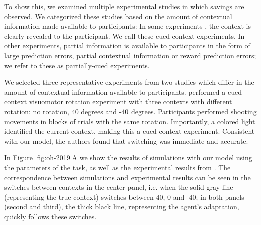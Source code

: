 \documentclass[a4paper,doc,floatsintext,natbib]{apa6}%
\def \fref #1{Figure \ref{#1}}     %
\begin{document}
To show this, we examined multiple experimental studies in which savings are observed. We categorized these studies based on the amount of contextual information made available to participants: In some experiments \citep[e.g.][]{Kim_Neural_2015,Lee_Dual_2009}, the context is clearly revealed to the participant. We call these cued-context experiments. In other experiments, partial information is available to participants \citep[e.g.][]{Davidson_Scaling_2004,Zarahn_Explaining_2008} in the form of large prediction errors, partial contextual information or reward prediction errors; we refer to these as partially-cued experiments.

We selected three representative experiments from two studies \citep{Kim_Neural_2015,Oh_Minimizing_2019} which differ in the amount of contextual information available to participants. \cite{Kim_Neural_2015} performed a cued-context visuomotor rotation experiment with three contexts with different rotation: no rotation, 40 degrees and -40 degrees. Participants performed shooting movements in blocks of trials with the same rotation. Importantly, a colored light identified the current context, making this a cued-context experiment. Consistent with our model, the authors found that switching was immediate and accurate.

In \fref{fig:oh-2019}A we show the results of simulations with our model using the parameters of the task, as well as the experimental results from \cite{Kim_Neural_2015}. The correspondence between simulations and experimental results can be seen in the switches between contexts in the center panel, i.e. when the solid gray line (representing the true context) switches between 40, 0 and -40; in both panels (second and third), the thick black line, representing the agent's adaptation, quickly follows these switches.
\end{document}

